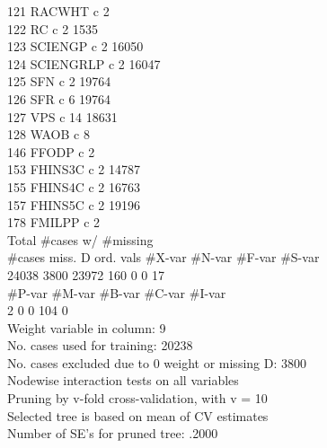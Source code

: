 \documentclass[12pt]{article}
\begin{document}
     121  RACWHT     c                                  2\\
     122  RC         c                                  2      1535\\
     123  SCIENGP    c                                  2     16050\\
     124  SCIENGRLP  c                                  2     16047\\
     125  SFN        c                                  2     19764\\
     126  SFR        c                                  6     19764\\
     127  VPS        c                                 14     18631\\
     128  WAOB       c                                  8\\
     146  FFODP      c                                  2\\
     153  FHINS3C    c                                  2     14787\\
     155  FHINS4C    c                                  2     16763\\
     157  FHINS5C    c                                  2     19196\\
     178  FMILPP     c                                  2\\

      Total  \#cases w/   \#missing\\
     \#cases    miss. D  ord. vals  \#X-var   \#N-var   \#F-var   \#S-var\\
      24038       3800      23972      160        0        0       17\\
     \#P-var   \#M-var   \#B-var   \#C-var   \#I-var\\
          2        0        0      104        0\\
 Weight variable in column: 9\\
 No. cases used for training: 20238\\
 No. cases excluded due to 0 weight or missing D: 3800\\
  
 Nodewise interaction tests on all variables\\
 Pruning by v-fold cross-validation, with v = 10\\
 Selected tree is based on mean of CV estimates\\
 Number of SE's for pruned tree: .2000\\
  
\end{document}
